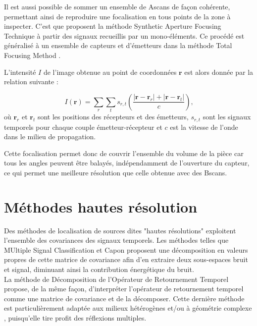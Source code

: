 Il est aussi possible de sommer un ensemble de Ascans de façon cohérente, permettant ainsi de reproduire une focalisation en tous points de la zone à inspecter. C'est que proposent la méthode Synthetic Aperture Focusing Technique \citep{doctor_saft} à partir des signaux recueillis par un mono-éléments. Ce procédé est généralisé à un ensemble de capteurs et d'émetteurs dans la méthode Total Focusing Method \citep{holmes_tfm}. 

L'intensité $I$ de l'image obtenue au point de coordonnées $\bm{r}$ est alors donnée par la relation suivante : 

\begin{equation*}
	I(\bm{r})= \displaystyle\sum_{r} \displaystyle\sum_{t} s_{r,t}\left( \frac{|\bm{r} - \bm{r}_r| + |\bm{r} - \bm{r}_t|}{c}\right) \text{,}
\end{equation*}
où $\bm{r}_r$ et $\bm{r}_t$ sont les positions des récepteurs et des émetteurs, $s_{r,t}$ sont les signaux temporels pour chaque couple émetteur-récepteur et $c$ est la vitesse de l'onde dans le milieu de propagation.

Cette focalisation permet donc de couvrir l'ensemble du volume de la pièce car tous les angles peuvent être balayés, indépendamment de l'ouverture du capteur, ce qui permet une meilleure résolution que celle obtenue avec des Bscans.\\






\section{Méthodes hautes résolution}


Des méthodes de localisation de sources dites "hautes résolutions" exploitent l'ensemble des covariances des signaux temporels. Les méthodes telles que MUltiple Signal Classification \citep{schmidt} et Capon \citep{capon} proposent une décomposition en valeurs propres de cette matrice de covariance afin d'en extraire deux sous-espaces bruit et signal, diminuant ainsi la contribution énergétique du bruit. \\

La méthode de Décomposition de l'Opérateur de Retournement Temporel \citep{prada_2002} propose, de la même façon, d'interpréter l'opérateur de retournement temporel comme une matrice de covariance et de la décomposer. Cette dernière méthode est particulièrement adaptée aux milieux hétérogènes et/ou à géométrie complexe , puisqu'elle tire profit des réflexions multiples. 


